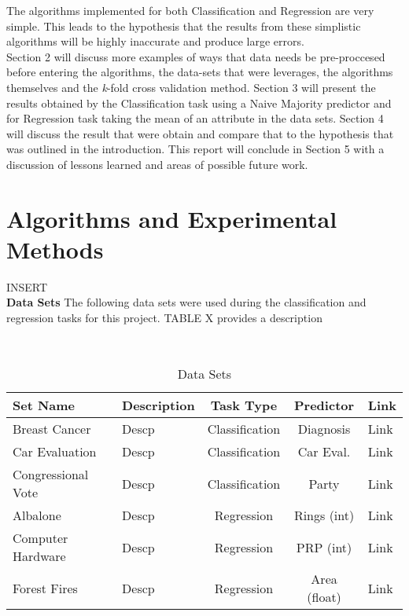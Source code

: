 \documentclass[twoside,11pt]{article}
\begin{document}
\hspace*{10mm} The algorithms implemented for both Classification and Regression are very simple. This leads to the hypothesis that the results from these simplistic algorithms will be highly inaccurate and produce large errors.\\
\hspace*{10mm} Section 2 will discuss more examples of ways that data needs be pre-proccesed before entering the algorithms, the data-sets that were leverages, the algorithms themselves and the \textit{k}-fold cross validation method. Section 3 will present the results obtained by the Classification task using a Naive Majority predictor and for Regression task taking the mean of an attribute in the data sets. Section 4 will discuss the result that were obtain and compare that to the hypothesis that was outlined in the introduction. This report will conclude in Section 5 with a discussion of lessons learned and areas of possible future work.\\

\newpage


\section{Algorithms and Experimental Methods}
INSERT\\

{\noindent}{\bf Data Sets}
The following data sets were used during the classification and regression tasks for this project. TABLE X provides a description 

\begin{table}[h!]
		\caption{Data Sets}
		\label{tab:table1}\\
		\begin{tabular}{l|l|c|c|l} 
			\textbf{Set Name} & 
			\textbf{Description} & 
			\textbf{Task Type} & 
			\textbf{Predictor} & 
			\textbf{Link}\\
			\hline
			Breast Cancer & 
			Descp & 
			Classification & 
			Diagnosis & 
			Link\\
				
			Car Evaluation & 
			Descp & 
			Classification & 
			Car Eval. & 
			Link\\
			
			Congressional Vote & 
			Descp & 
			Classification & 
			Party & 
			Link\\
			
			Albalone & 
			Descp & 
			Regression & 
			Rings (int) & 
			Link\\

			Computer Hardware & 
			Descp & 
			Regression & 
			PRP (int) & 
			Link\\
			
			Forest Fires & 
			Descp & 
			Regression & 
			Area (float) & 
			Link\\
			
		\end{tabular}
\end{table}
\end{document}
